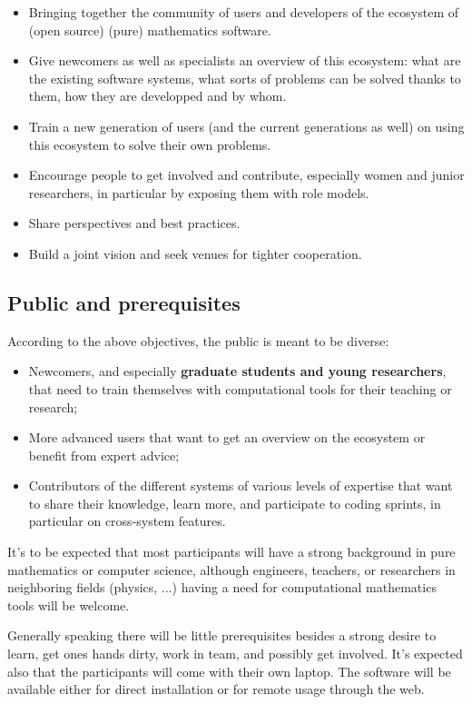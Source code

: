 \documentclass[12pt]{amsart}
\begin{document}
\begin{itemize}
\item Bringing together the community of users and developers of the
  ecosystem of (open source) (pure) mathematics software.
\item Give newcomers as well as specialists an overview of this
  ecosystem: what are the existing software systems, what sorts of
  problems can be solved thanks to them, how they are developped and
  by whom.
\item Train a new generation of users (and the current generations as
  well) on using this ecosystem to solve their own problems.
\item Encourage people to get involved and contribute, especially
  women and junior researchers, in particular by exposing them with role models.
\item Share perspectives and best practices. 
\item Build a joint vision and
  seek venues for tighter cooperation.
\end{itemize}

\subsection{Public and prerequisites}

According to the above objectives, the public is meant to be diverse:
\begin{itemize}
\item Newcomers, and especially \textbf{graduate students and young
    researchers}, that need to train themselves with computational
  tools for their teaching or research;
\item More advanced users that want to get an overview on the
  ecosystem or benefit from expert advice;
\item Contributors of the different systems of various levels of
  expertise that want to share their knowledge, learn more, and
  participate to coding sprints, in particular on cross-system
  features.
\end{itemize}

It's to be expected that most participants will have a strong
background in pure mathematics or computer science, although
engineers, teachers, or researchers in neighboring fields (physics,
...) having a need for computational mathematics tools will be
welcome.

Generally speaking there will be little prerequisites besides a strong
desire to learn, get ones hands dirty, work in team, and possibly get
involved. It's expected also that the participants will come with
their own laptop. The software will be available either for direct
installation or for remote usage through the web.
\end{document}
